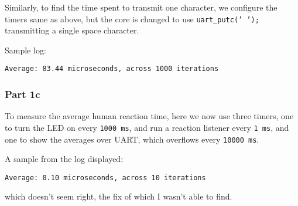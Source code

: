 Similarly, to find the time spent to transmit one character, we configure the timers same as above, but the core is changed to use \texttt{uart\_putc(' ');} transmitting a single space character.

Sample log:
\begin{verbatim}
Average: 83.44 microseconds, across 1000 iterations
\end{verbatim}

\subsubsection*{Part 1c}

To measure the average human reaction time, here we now use three timers, one to turn the LED on every \texttt{1000\,ms}, and run a reaction listener every \texttt{1\,ms}, and one to show the averages over UART, which overflows every \texttt{10000\,ms}.

A sample from the log displayed:
\begin{verbatim}
Average: 0.10 microseconds, across 10 iterations
\end{verbatim}
which doesn't seem right, the fix of which I wasn't able to find.
